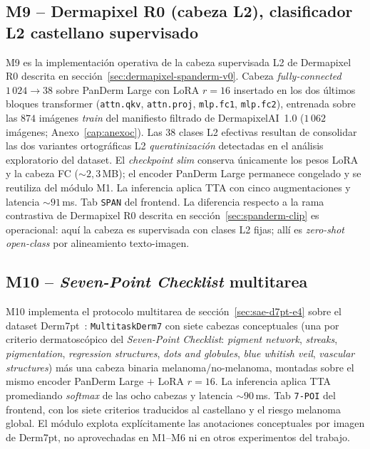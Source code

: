 \subsection{M9 -- Dermapixel R0 (cabeza L2), clasificador L2
castellano supervisado}
\label{sec:dermapixel-m9}

M9 es la implementación operativa de la cabeza supervisada L2 de
Dermapixel R0
descrita en sección~\ref{sec:dermapixel-spanderm-v0}. Cabeza
\emph{fully-connected} $1\,024 \to 38$ sobre PanDerm Large con
LoRA $r = 16$ insertado en los dos últimos bloques transformer
(\texttt{attn.qkv}, \texttt{attn.proj}, \texttt{mlp.fc1},
\texttt{mlp.fc2}), entrenada sobre las $874$ imágenes \emph{train}
del manifiesto filtrado de DermapixelAI~1.0 ($1\,062$ imágenes;
Anexo~\ref{cap:anexoc}). Las $38$ clases L2
efectivas resultan de consolidar las dos variantes ortográficas
L2 \emph{queratinización} detectadas en el análisis exploratorio
del dataset. El \emph{checkpoint} \emph{slim} conserva únicamente
los pesos LoRA y la cabeza FC ($\sim 2{,}3$\,MB); el encoder
PanDerm Large permanece congelado y se reutiliza del módulo M1.
La inferencia aplica TTA con cinco augmentaciones y latencia
$\sim 91$\,ms. Tab \texttt{SPAN} del frontend. La diferencia
respecto a la rama contrastiva de Dermapixel R0 descrita en
sección~\ref{sec:spanderm-clip} es operacional: aquí la cabeza
es supervisada con clases L2 fijas; allí es \emph{zero-shot
open-class} por alineamiento texto-imagen.

\subsection{M10 -- \emph{Seven-Point Checklist} multitarea}
\label{sec:dermapixel-m10}

M10 implementa el protocolo multitarea de
sección~\ref{sec:sae-d7pt-e4} sobre el dataset
Derm7pt~\cite{kawahara2019}: \texttt{MultitaskDerm7} con siete
cabezas conceptuales (una por criterio dermatoscópico del
\emph{Seven-Point Checklist}: \emph{pigment network}, \emph{streaks},
\emph{pigmentation}, \emph{regression structures},
\emph{dots and globules}, \emph{blue whitish veil},
\emph{vascular structures}) más una cabeza binaria
melanoma/no-melanoma, montadas sobre el mismo encoder PanDerm
Large $+$ LoRA $r = 16$. La inferencia aplica TTA promediando
\emph{softmax} de las ocho cabezas y latencia $\sim 90$\,ms.
Tab \texttt{7-POI} del frontend, con los siete criterios
traducidos al castellano y el riesgo melanoma global. El módulo
explota explícitamente las anotaciones conceptuales por imagen
de Derm7pt, no aprovechadas en M1--M6 ni en otros experimentos
del trabajo.

